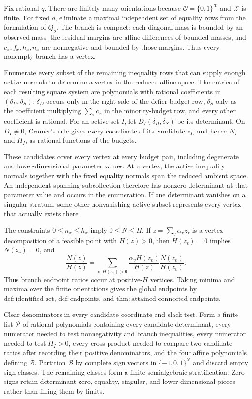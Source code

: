 Fix rational \(q\). There are finitely many orientations because \(\mathcal O=\{0,1\}^{\mathcal X}\) and \(\mathcal X\) is finite. For fixed \(o\), eliminate a maximal independent set of equality rows from the formulation of \(Q_o\). The branch is compact: each diagonal mass is bounded by an observed mass, the residual margins are affine differences of bounded masses, and \(c_x,f_x,h_x,n_x\) are nonnegative and bounded by those margins. Thus every nonempty branch has a vertex.

Enumerate every subset of the remaining inequality rows that can supply enough active normals to determine a vertex in the reduced affine space. The entries of each resulting square system are polynomials with rational coefficients in \((\delta_D,\delta_S)\): \(\delta_D\) occurs only in the right side of the defier-budget row, \(\delta_S\) only as the coefficient multiplying \(\sum_xc_x\) in the minority-budget row, and every other coefficient is rational. For an active set \(I\), let \(D_I(\delta_D,\delta_S)\) be its determinant. On \(D_I\neq0\), Cramer's rule gives every coordinate of its candidate \(z_I\), and hence \(N_I\) and \(H_I\), as rational functions of the budgets.

These candidates cover every vertex at every budget pair, including degenerate and lower-dimensional parameter values. At a vertex, the active inequality normals together with the fixed equality normals span the reduced ambient space. An independent spanning subcollection therefore has nonzero determinant at that parameter value and occurs in the enumeration. If one determinant vanishes on a singular stratum, some other nonvanishing active subset represents every vertex that actually exists there.

The constraints \(0\leq n_x\leq h_x\) imply \(0\leq N\leq H\). If \(z=\sum_v\alpha_vz_v\) is a vertex decomposition of a feasible point with \(H(z)>0\), then \(H(z_v)=0\) implies \(N(z_v)=0\), and
\[
 \frac{N(z)}{H(z)}
 =\sum_{v:H(z_v)>0}
 \frac{\alpha_vH(z_v)}{H(z)}
 \frac{N(z_v)}{H(z_v)}.
\]
Thus branch endpoint ratios occur at positive-\(H\) vertices. Taking minima and maxima over the finite orientations gives the global endpoints by \(\mathrm{def:identified\text{-}set}\), \(\mathrm{def:endpoints}\), and \(\mathrm{thm:attained\text{-}connected\text{-}endpoints}\).

Clear denominators in every candidate coordinate and slack test. Form a finite list \(\mathscr P\) of rational polynomials containing every candidate determinant, every numerator needed to test nonnegativity and branch inequalities, every numerator needed to test \(H_I>0\), every cross-product needed to compare two candidate ratios after recording their positive denominators, and the four affine polynomials defining \(\mathcal B\). Partition \(\mathcal B\) by complete sign vectors in \(\{-1,0,1\}^{\mathscr P}\) and discard empty sign classes. The remaining classes form a finite semialgebraic stratification. Zero signs retain determinant-zero, equality, singular, and lower-dimensional pieces rather than filling them by limits.

